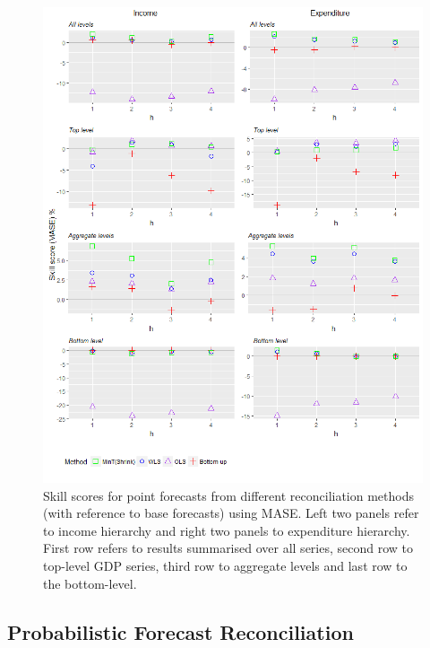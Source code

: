 \documentclass[graybox]{svmult}
\begin{document}
\begin{figure}
	\centering
	\small
	\includegraphics[width=\textwidth]{Figs/Results/PointF_MASE.png}
	\caption{Skill scores for point forecasts from different reconciliation methods (with reference to base forecasts) using MASE. Left two panels refer to income hierarchy and right two panels to expenditure hierarchy. First row refers to results summarised over all series, second row to top-level GDP series, third row to aggregate levels and last row to the bottom-level.}
	\label{fig: PointF_MASE}
\end{figure}

\subsection{Probabilistic Forecast Reconciliation}
\end{document}
